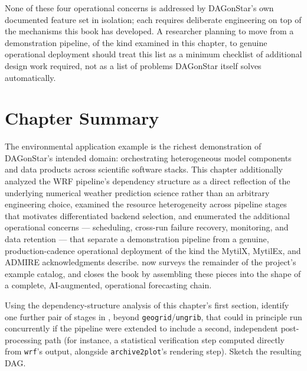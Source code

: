 \begin{cautionbox}
None of these four operational concerns is addressed by DAGonStar's own
documented feature set in isolation; each requires deliberate engineering
on top of the mechanisms this book has developed. A researcher planning to
move from a demonstration pipeline, of the kind examined in this chapter, to
genuine operational deployment should treat this list as a minimum
checklist of additional design work required, not as a list of problems
DAGonStar itself solves automatically.
\end{cautionbox}

\section{Chapter Summary}

The environmental application example is the richest demonstration of
DAGonStar's intended domain: orchestrating heterogeneous model components and
data products across scientific software stacks. This chapter additionally
analyzed the WRF pipeline's dependency structure as a direct reflection of
the underlying numerical weather prediction science rather than an arbitrary
engineering choice, examined the resource heterogeneity across pipeline
stages that motivates differentiated backend selection, and enumerated the
additional operational concerns --- scheduling, cross-run failure recovery,
monitoring, and data retention --- that separate a demonstration pipeline
from a genuine, production-cadence operational deployment of the kind the
MytilX, MytilEx, and ADMIRE acknowledgments describe. 
now surveys the remainder of the project's example catalog, and
 closes the book by assembling these pieces into the
shape of a complete, AI-augmented, operational forecasting chain.

\begin{exercise}
Using the dependency-structure analysis of this chapter's first section,
identify one further pair of stages in , beyond
\texttt{geogrid}/\texttt{ungrib}, that could in principle run concurrently
if the pipeline were extended to include a second, independent
post-processing path (for instance, a statistical verification step
computed directly from \texttt{wrf}'s output, alongside
\texttt{archive2plot}'s rendering step). Sketch the resulting DAG.
\end{exercise}
